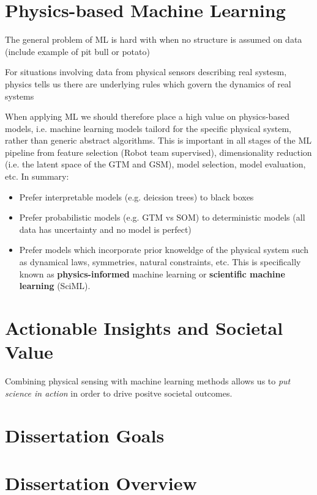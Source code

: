 \section{Physics-based Machine Learning}

The general problem of ML is hard with when no structure is assumed on data (include example of pit bull or potato)

For situations involving data from physical sensors describing real systesm, physics tells us there are underlying rules which govern the dynamics of real systems

When applying ML we should therefore place a high value on physics-based models, i.e. machine learning models tailord for the specific physical system, rather than generic abstract algorithms. This is important in all stages of the ML pipeline from feature selection (Robot team supervised), dimensionality reduction (i.e. the latent space of the GTM and GSM), model selection, model evaluation, etc. In summary:

\begin{itemize}
  \item Prefer interpretable models (e.g. deicsion trees) to black boxes
  \item Prefer probabilistic models (e.g. GTM vs SOM) to deterministic models (all data has uncertainty and no model is perfect)
  \item Prefer models which incorporate prior knoweldge of the physical system such as dynamical laws, symmetries, natural constraints, etc. This is specifically known as \textbf{physics-informed} machine learning or \textbf{scientific machine learning}  (SciML).
\end{itemize}



\section{Actionable Insights and Societal Value}

Combining physical sensing with machine learning methods allows us to \textit{put science in action} in order to drive positve societal outcomes.


\section{Dissertation Goals}

\section{Dissertation Overview}

